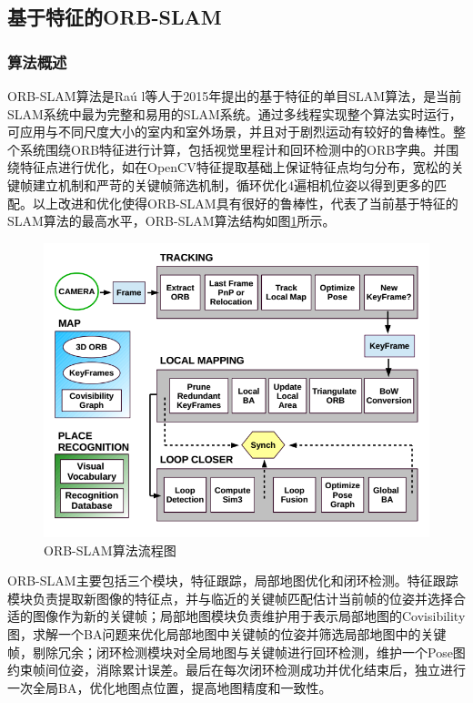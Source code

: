 \subsection{基于特征的ORB-SLAM}

\subsubsection*{算法概述}
ORB-SLAM算法是Ra\'u l等人于2015年提出的基于特征的单目SLAM算法，是当前SLAM系统中最为完整和易用的SLAM系统。通过多线程实现整个算法实时运行，可应用与不同尺度大小的室内和室外场景，并且对于剧烈运动有较好的鲁棒性。整个系统围绕ORB特征进行计算，包括视觉里程计和回环检测中的ORB字典。并围绕特征点进行优化，如在OpenCV特征提取基础上保证特征点均匀分布，宽松的关键帧建立机制和严苛的关键帧筛选机制，循环优化4遍相机位姿以得到更多的匹配。以上改进和优化使得ORB-SLAM具有很好的鲁棒性，代表了当前基于特征的SLAM算法的最高水平，ORB-SLAM算法结构如图\ref{fig3.6}所示。
\begin{figure}[h]
\centering
\includegraphics[scale=0.5]{figures/Fig3.6.png}
\caption{ORB-SLAM算法流程图}
\label{fig3.6}
\end{figure}

ORB-SLAM主要包括三个模块，特征跟踪，局部地图优化和闭环检测。特征跟踪模块负责提取新图像的特征点，并与临近的关键帧匹配估计当前帧的位姿并选择合适的图像作为新的关键帧；局部地图模块负责维护用于表示局部地图的Covisibility图，求解一个BA问题来优化局部地图中关键帧的位姿并筛选局部地图中的关键帧，剔除冗余；闭环检测模块对全局地图与关键帧进行回环检测，维护一个Pose图约束帧间位姿，消除累计误差。最后在每次闭环检测成功并优化结束后，独立进行一次全局BA，优化地图点位置，提高地图精度和一致性。


